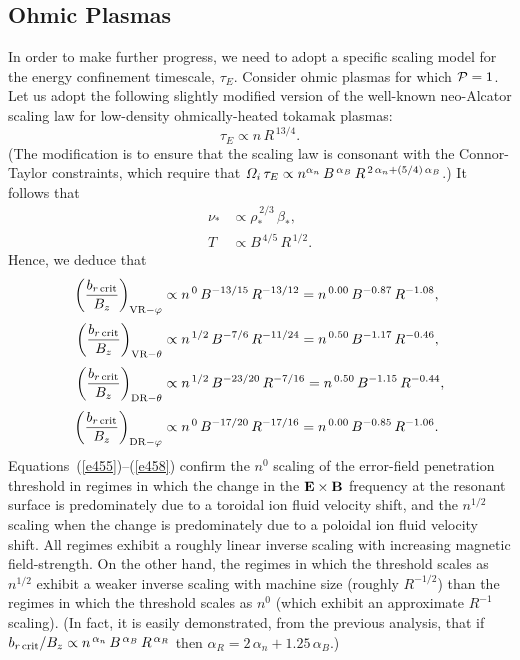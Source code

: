 \documentclass[12pt,prb,aps]{revtex4-1}
\begin{document}
\subsection{Ohmic Plasmas}
In order to make further progress, we need to adopt a specific scaling model for the energy confinement timescale, $\tau_E$. Consider ohmic plasmas for which ${\cal P}=1$. Let us adopt
the following slightly modified version of the well-known neo-Alcator scaling law for low-density ohmically-heated tokamak plasmas:\cite{goldston,simmet,rf2012} 
\begin{equation}
\tau_E\propto n\,R^{\,13/4}.
\end{equation}
(The modification is to ensure that the scaling law is consonant with the Connor-Taylor constraints, which
require that ${\mit\Omega}_i\,\tau_E\propto n^{\alpha_n}\,B^{\,\alpha_B}\,R^{\,2\,\alpha_n+(5/4)\,\alpha_B}$.\cite{connor})
It follows that
\begin{align}
\nu_\ast&\propto \rho_\ast^{\,2/3}\,\beta_\ast,\\[0.5ex]
T&\propto B^{\,4/5}\,R^{\,1/2}.
\end{align}
Hence, we deduce that 
\begin{align}\label{e455}
\left(\frac{b_{r\,{\rm crit}}}{B_z}\right)_{{\rm VR}-\varphi} &\propto n^{\,0}\,B^{-13/15}\,R^{-13/12}= n^{\,0.00}\,B^{-0.87}\,R^{-1.08},\\[0.5ex]
\left(\frac{b_{r\,{\rm crit}}}{B_z}\right)_{{\rm VR}-\theta} &\propto n^{\,1/2}\,B^{-7/6}\,R^{-11/24}= n^{\,0.50}\,B^{-1.17}
\,R^{-0.46},\\[0.5ex]
\left(\frac{b_{r\,{\rm crit}}}{B_z}\right)_{{\rm DR}-\theta} &\propto n^{\,1/2}\,B^{-23/20}\,R^{-7/16}=n^{\,0.50}\,B^{-1.15}\,R^{-0.44},\\[0.5ex]
\left(\frac{b_{r\,{\rm crit}}}{B_z}\right)_{{\rm DR}-\varphi} &\propto n^{\,0}\,B^{-17/20}\,R^{-17/16}= n^{\,0.00}\,B^{-0.85}\,R^{-1.06}.\label{e458}
\end{align}
Equations~(\ref{e455})--(\ref{e458}) confirm the $n^{0}$ scaling of the error-field penetration threshold in regimes in which the change in the ${\bf E}\times{\bf B}$ frequency at the resonant surface is predominately due to a toroidal
ion fluid velocity shift, and the $n^{1/2}$ scaling when the change is predominately due to a poloidal ion fluid velocity shift. All regimes exhibit a roughly linear inverse scaling with increasing magnetic field-strength. On the other hand, the regimes in which the threshold scales as $n^{1/2}$ exhibit a
weaker inverse scaling with machine size (roughly $R^{-1/2}$) than the regimes in which the threshold scales as $n^0$ (which
exhibit an approximate $R^{-1}$ scaling). (In fact, it is easily demonstrated, from the previous analysis, that if 
$b_{r\,{\rm crit}}/B_z\propto n^{\,\alpha_n}\,B^{\,\alpha_B}\,R^{\,\alpha_R}$ then $\alpha_R = 2\,\alpha_n+1.25\,\alpha_B$.\cite{buttery})
\end{document}
